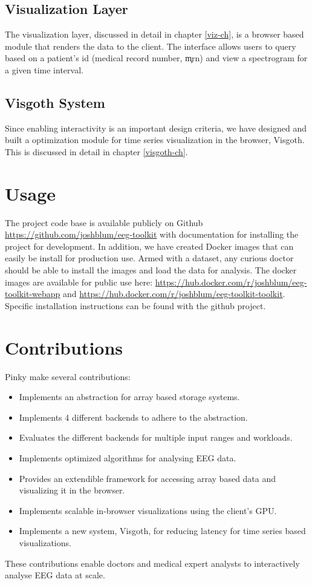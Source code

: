 \subsection{Visualization Layer}

The visualization layer, discussed in detail in chapter \ref{viz-ch}, is a browser
based module that renders the data to the client. The interface allows users to
query based on a patient's id (medical record number, \c{mrn}) and view a spectrogram
for a given time interval.

\subsection{Visgoth System}

Since enabling interactivity is an important design criteria, we have designed
and built a optimization module for time series visualization in the browser,
Visgoth. This is discussed in detail in chapter \ref{visgoth-ch}.

\section{Usage}

The project code base is available publicly on Github \cite{github}
\url{https://github.com/joshblum/eeg-toolkit} with documentation for installing
the project for development. In addition, we have created Docker \cite{docker}
images that can easily be install for production use. Armed with a dataset, any
curious doctor should be able to install the images and load the data for
analysis. The docker images are available for public use here:
\url{https://hub.docker.com/r/joshblum/eeg-toolkit-webapp} and
\url{https://hub.docker.com/r/joshblum/eeg-toolkit-toolkit}. Specific
installation instructions can be found with the github project.

\section{Contributions}

Pinky make several contributions:

\begin{itemize}
  \item Implements an abstraction for array based storage systems.
  \item Implements 4 different backends to adhere to the abstraction.
  \item Evaluates the different backends for multiple input ranges and workloads.
  \item Implements optimized algorithms for analysing EEG data.
  \item Provides an extendible framework for accessing array based data and visualizing it in the browser.
  \item Implements scalable in-browser visualizations using the client's GPU.
  \item Implements a new system, Visgoth, for reducing latency for time series based visualizations.
\end{itemize}

These contributions enable doctors and medical expert analysts to interactively
analyse EEG data at scale.


